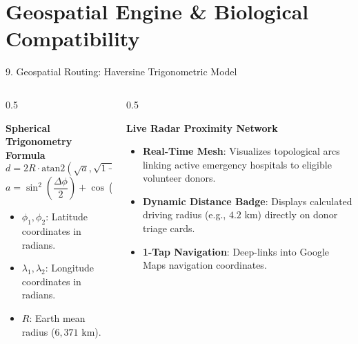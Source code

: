 \documentclass[aspectratio=169,10pt]{beamer}
\begin{document}
\section{Geospatial Engine \& Biological Compatibility}

\begin{frame}{9. Geospatial Routing: Haversine Trigonometric Model}
    \begin{columns}[T]
        \begin{column}{0.5\textwidth}
            \begin{block}{\textbf{Spherical Trigonometry Formula}}
                \scriptsize
                \[ d = 2R \cdot \text{atan2}\left(\sqrt{a}, \sqrt{1-a}\right) \]
                \[ a = \sin^2\left(\frac{\Delta \phi}{2}\right) + \cos(\phi_1)\cos(\phi_2)\sin^2\left(\frac{\Delta \lambda}{2}\right) \]
                \begin{itemize}
                    \item $\phi_1, \phi_2$: Latitude coordinates in radians.
                    \item $\lambda_1, \lambda_2$: Longitude coordinates in radians.
                    \item $R$: Earth mean radius ($6,371\text{ km}$).
                \end{itemize}
            \end{block}
        \end{column}
        \begin{column}{0.5\textwidth}
            \begin{exampleblock}{\textbf{Live Radar Proximity Network}}
                \scriptsize
                \begin{itemize}
                    \item \textbf{Real-Time Mesh}: Visualizes topological arcs linking active emergency hospitals to eligible volunteer donors.
                    \item \textbf{Dynamic Distance Badge}: Displays calculated driving radius (e.g., $4.2\text{ km}$) directly on donor triage cards.
                    \item \textbf{1-Tap Navigation}: Deep-links into Google Maps navigation coordinates.
                \end{itemize}
            \end{exampleblock}
        \end{column}
    \end{columns}
\end{frame}
\end{document}
